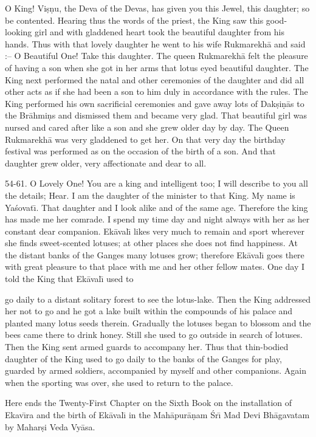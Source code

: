 O King! Vi\d{s}\d{n}u, the Deva of the Devas, has given you this Jewel, this daughter; so be contented. Hearing thus the words of the priest, the King saw this good-looking girl and with gladdened heart took the beautiful daughter from his hands. Thus with that lovely daughter he went to his wife Rukmarekh\=a and said :-- O Beautiful One! Take this daughter. The queen Rukmarekh\=a felt the pleasure of having a son when she got in her arms that lotus eyed beautiful daughter. The King next performed the natal and other ceremonies of the daughter and did all other acts as if she had been a son to him duly in accordance with the rules. The King performed his own sacrificial ceremonies and gave away lots of Dak\d{s}i\d{n}\=as to the Br\=ahmi\d{n}s and dismissed them and became very glad. That beautiful girl was nursed and cared after like a son and she grew older day by day. The Queen Rukmarekh\=a was very gladdened to get her. On that very day the birthday festival was performed as on the occasion of the birth of a son. And that daughter grew older, very affectionate and dear to all.

54-61. O Lovely One! You are a king and intelligent too; I will describe to you all the details; Hear. I am the daughter of the minister to that King. My name is Ya\'sovat\={\i}. That daughter and I look alike and of the same age. Therefore the king has made me her comrade. I spend my time day and night always with her as her constant dear companion. Ek\=aval\={\i} likes very much to remain and sport wherever she finds sweet-scented lotuses; at other places she does not find happiness. At the distant banks of the Ganges many lotuses grow; therefore Ek\=aval\={\i} goes there with great pleasure to that place with me and her other fellow mates. One day I told the King that Ek\=aval\={\i} used to

go daily to a distant solitary forest to see the lotus-lake. Then the King addressed her not to go and he got a lake built within the compounds of his palace and planted many lotus seeds therein. Gradually the lotuses began to blossom and the bees came there to drink honey. Still she used to go outside in search of lotuses. Then the King sent armed guards to accompany her. Thus that thin-bodied daughter of the King used to go daily to the banks of the Ganges for play, guarded by armed soldiers, accompanied by myself and other companions. Again when the sporting was over, she used to return to the palace.

Here ends the Twenty-First Chapter on the Sixth Book on the installation of Ekav\={\i}ra and the birth of Ek\=aval\={\i} in the Mah\=apur\=a\d{n}am \'Sr\={\i} Mad Devi Bh\=agavatam by Mahar\d{s}i Veda Vy\=asa.



